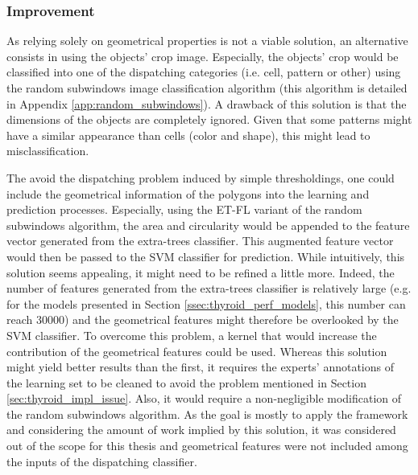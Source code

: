 \subsubsection{Improvement}

As relying solely on geometrical properties is not a viable solution, an alternative consists in using the objects' crop image. Especially, the objects' crop would be classified into one of the dispatching categories (i.e. cell, pattern or other) using the random subwindows image classification algorithm \cite{Maree201617} (this algorithm is detailed in Appendix \ref{app:random_subwindows}). A drawback of this solution is that the dimensions of the objects are completely ignored. Given that some patterns might have a similar appearance than cells (color and shape), this might lead to misclassification. 

The avoid the dispatching problem induced by simple thresholdings, one could include the geometrical information of the polygons into the learning and prediction processes. Especially, using the ET-FL variant of the random subwindows algorithm, the area and circularity would be appended to the feature vector generated from the extra-trees classifier. This augmented feature vector would then be passed to the SVM classifier for prediction. While intuitively, this solution seems appealing, it might need to be refined a little more. Indeed, the number of features generated from the extra-trees classifier is relatively large (e.g. for the models presented in Section \ref{ssec:thyroid_perf_models}, this number can reach 30000) and the geometrical features might therefore be overlooked by the SVM classifier. To overcome this problem, a kernel that would increase the contribution of the geometrical features could be used. Whereas this solution might yield better results than the first, it requires the experts' annotations of the learning set to be cleaned to avoid the problem mentioned in Section \ref{sec:thyroid_impl_issue}. Also, it would require a non-negligible modification of the random subwindows algorithm. As the goal is mostly to apply the framework and considering the amount of work implied by this solution, it was considered out of the scope for this thesis and geometrical features were not included among the inputs of the dispatching classifier.

